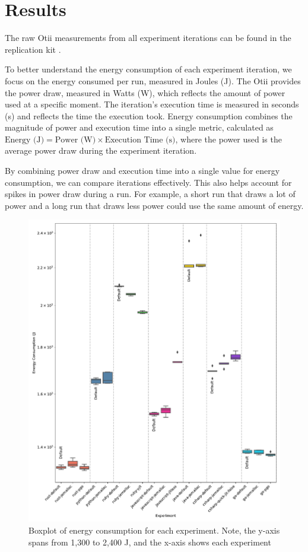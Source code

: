 \documentclass[main.tex]{subfiles}
\begin{document}
\section{Results}

The raw Otii measurements from all experiment iterations can be found in the replication kit \cite{replication-kit-Karlsen_Landsgaard_Offenberg_Pedersen_2025}.

To better understand the energy consumption of each experiment iteration, we focus on the energy consumed per run, measured in Joules (J). The Otii provides the power draw, measured in Watts (W), which reflects the amount of power used at a specific moment. The iteration's execution time is measured in seconds (s) and reflects the time the execution took. Energy consumption combines the magnitude of power and execution time into a single metric, calculated as \( \text{Energy (J)} = \text{Power (W)} \times \text{Execution Time (s)} \), where the power used is the average power draw during the experiment iteration.

By combining power draw and execution time into a single value for energy consumption, we can compare iterations effectively. This also helps account for spikes in power draw during a run. For example, a short run that draws a lot of power and a long run that draws less power could use the same amount of energy. 

\begin{figure}[]
    \centering
    \includegraphics[width=1\linewidth]{media/results/boxplot.pdf}
    \caption{Boxplot of energy consumption for each experiment. Note, the y-axis spans from 1,300 to 2,400 J, and the x-axis shows each experiment}
    \label{fig:boxplot}
\end{figure}
\end{document}
